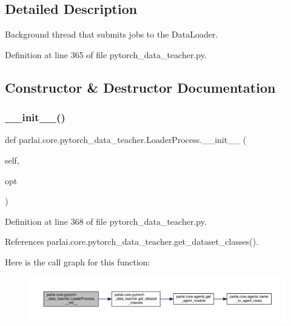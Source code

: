 \subsection{Detailed Description}
\begin{DoxyVerb}Background thread that submits jobs to the DataLoader.\end{DoxyVerb}
 

Definition at line 365 of file pytorch\+\_\+data\+\_\+teacher.\+py.



\subsection{Constructor \& Destructor Documentation}
\mbox{\label{classparlai_1_1core_1_1pytorch__data__teacher_1_1LoaderProcess_a4d40640c8122f0f93dc49a3eaa188260}} 
\subsubsection{\texorpdfstring{\+\_\+\+\_\+init\+\_\+\+\_\+()}{\_\_init\_\_()}}
{\footnotesize\ttfamily def parlai.\+core.\+pytorch\+\_\+data\+\_\+teacher.\+Loader\+Process.\+\_\+\+\_\+init\+\_\+\+\_\+ (\begin{DoxyParamCaption}\item[{}]{self,  }\item[{}]{opt }\end{DoxyParamCaption})}



Definition at line 368 of file pytorch\+\_\+data\+\_\+teacher.\+py.



References parlai.\+core.\+pytorch\+\_\+data\+\_\+teacher.\+get\+\_\+dataset\+\_\+classes().

Here is the call graph for this function\+:
\nopagebreak
\begin{figure}[H]
\begin{center}
\leavevmode
\includegraphics[width=350pt]{classparlai_1_1core_1_1pytorch__data__teacher_1_1LoaderProcess_a4d40640c8122f0f93dc49a3eaa188260_cgraph}
\end{center}
\end{figure}


